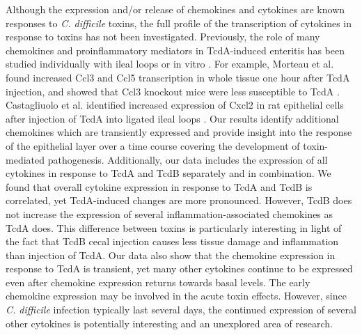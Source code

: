 Although the expression and/or release of chemokines and cytokines are known responses to \textit{C. difficile} toxins, the full profile of the transcription of cytokines in response to toxins has not been investigated. Previously, the role of many chemokines and proinflammatory mediators in TcdA-induced enteritis has been studied individually with ileal loops or in vitro \cite{Sun:2010kt}. For example, Morteau et al. found increased Ccl3 and Ccl5 transcription in whole tissue one hour after TcdA injection, and showed that Ccl3 knockout mice were less susceptible to TcdA \cite{Morteau:2002ts}. Castagliuolo et al. identified increased expression of Cxcl2 in rat epithelial cells after injection of TcdA into ligated ileal loops \cite{Castagliuolo:1998um}. Our results identify additional chemokines which are transiently expressed and provide insight into the response of the epithelial layer over a time course covering the development of toxin-mediated pathogenesis. Additionally, our data includes the expression of all cytokines in response to TcdA and TcdB separately and in combination. We found that overall cytokine expression in response to TcdA and TcdB is correlated, yet TcdA-induced changes are more pronounced. However, TcdB does not increase the expression of several inflammation-associated chemokines as TcdA does. This difference between toxins is particularly interesting in light of the fact that TcdB cecal injection causes less tissue damage and inflammation than injection of TcdA. Our data also show that the chemokine expression in response to TcdA is transient, yet many other cytokines continue to be expressed even after chemokine expression returns towards basal levels. The early chemokine expression may be involved in the acute toxin effects. However, since \textit{C. difficile} infection typically last several days, the continued expression of several other cytokines is potentially interesting and an unexplored area of research.

